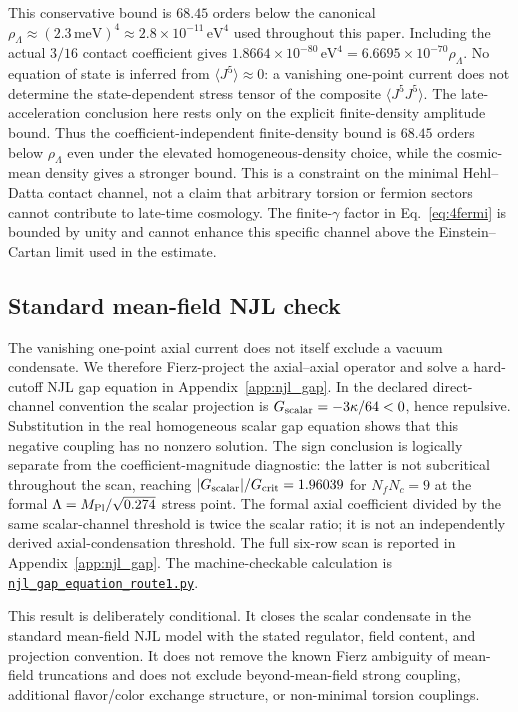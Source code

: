 \documentclass[aps,prd,twocolumn,superscriptaddress,showpacs,preprintnumbers,nofootinbib,longbibliography,floatfix]{revtex4-2}
\newcommand{\artifactnamed}[2]{\href{https://github.com/Hubify-Projects/bigbounce/blob/main/#1}{\nolinkurl{#2}}}
\begin{document}
This conservative bound is $68.45$ orders below the canonical
$\rho_\Lambda\approx (2.3\,\text{meV})^4 \approx 2.8\times 10^{-11}\,\text{eV}^4$
used throughout this paper.  Including the actual $3/16$ contact coefficient
gives $1.8664\times10^{-80}\,\text{eV}^4=6.6695\times10^{-70}\rho_\Lambda$.
No equation of state is inferred from $\langle J^5\rangle\approx0$:
a vanishing one-point current does not determine the state-dependent stress
tensor of the composite $\langle J^5J^5\rangle$.  The late-acceleration
conclusion here rests only on the explicit finite-density amplitude bound.
Thus the coefficient-independent finite-density bound is $68.45$ orders below
$\rho_\Lambda$ even under the elevated homogeneous-density choice, while the
cosmic-mean density gives a stronger bound.  This is a constraint on the
minimal Hehl--Datta contact channel, not a claim that arbitrary torsion or
fermion sectors cannot contribute to late-time cosmology.  The finite-$\gamma$
factor in Eq.~\eqref{eq:4fermi} is bounded by unity and cannot enhance this
specific channel above the Einstein--Cartan limit used in the estimate.

\subsection{Standard mean-field NJL check}

The vanishing one-point axial current does not itself exclude a vacuum
condensate.  We therefore Fierz-project the axial--axial operator and solve a
hard-cutoff NJL gap equation in Appendix~\ref{app:njl_gap}.  In the declared
direct-channel convention the scalar projection is
$G_{\rm scalar}=-3\kappa/64<0$, hence repulsive.  Substitution in the real
homogeneous scalar gap equation shows that this negative coupling has no
nonzero solution.  The sign conclusion is logically separate from the
coefficient-magnitude diagnostic: the latter is not subcritical throughout
the scan, reaching $|G_{\rm scalar}|/G_{\rm crit}=1.96039$ for
$N_fN_c=9$ at the formal $\Lambda=M_{\rm Pl}/\sqrt{0.274}$ stress point.
The formal axial coefficient divided by the same scalar-channel threshold is
twice the scalar ratio; it is not an independently derived axial-condensation
threshold.  The full six-row scan is reported in Appendix~\ref{app:njl_gap}.
The machine-checkable calculation is
\artifactnamed{arxiv/scripts/njl_gap_equation_route1.py}{njl_gap_equation_route1.py}.

This result is deliberately conditional.  It closes the scalar condensate in
the standard mean-field NJL model with the stated regulator, field content,
and projection convention.  It does not remove the known Fierz ambiguity of
mean-field truncations and does not exclude beyond-mean-field strong coupling,
additional flavor/color exchange structure, or non-minimal torsion couplings.
\end{document}
